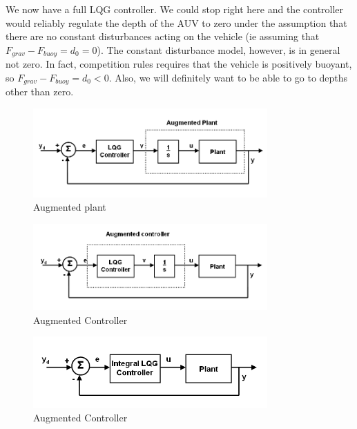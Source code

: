 \documentclass{article}
\begin{document}
We now have a full LQG controller.  We could stop right here and the controller would reliably regulate the depth of the AUV to zero under the assumption that there are no constant disturbances acting on the vehicle (ie assuming that $F_{grav}-F_{buoy}=d_0=0$).  The constant disturbance model, however, is in general not zero.  In fact, competition rules requires that the vehicle is positively buoyant, so $F_{grav}-F_{buoy}=d_0<0$.  Also, we will definitely want to be able to go to depths other than zero.

\begin{figure}[h]
\includegraphics[width=0.8\textwidth]{LQGAugmentedPlant.png}
\centering
\caption{Augmented plant}
\label{fig:LQGAugmentedPlant}
\end{figure}

\begin{figure}[h]
\includegraphics[width=0.8\textwidth]{LQGAugmentedController.png}
\centering
\caption{Augmented Controller}
\label{fig:LQGBlockDiagram}
\end{figure}

\begin{figure}[h]
\includegraphics[width=0.8\textwidth]{LQGIntegralController.png}
\centering
\caption{Augmented Controller}
\label{fig:LQGBlockDiagram}
\end{figure}
\end{document}
